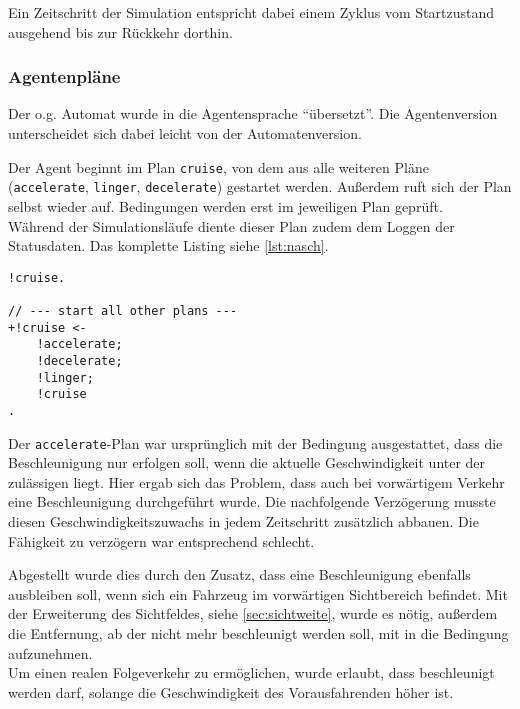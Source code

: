Ein Zeitschritt der Simulation entspricht dabei einem Zyklus vom Startzustand ausgehend bis zur Rückkehr dorthin.



\subsubsection{Agentenpläne}

Der o.g. Automat wurde in die Agentensprache \enquote{übersetzt}. 
Die Agentenversion unterscheidet sich dabei leicht von der Automatenversion. 

Der Agent beginnt im Plan \texttt{cruise}, von dem aus alle weiteren Pläne (\texttt{accelerate}, \texttt{linger}, \texttt{decelerate}) gestartet werden.
Außerdem ruft sich der Plan selbst wieder auf.
Bedingungen werden erst im jeweiligen Plan geprüft.
\\
Während der Simulationsläufe diente dieser Plan zudem dem Loggen der Statusdaten.
Das komplette Listing siehe \cref{lst:nasch}.

\begin{minipage}[hptb]{0.95\textwidth}
\begin{lstlisting}[style=asl, 
                   keywords={!cruise}, 
                   keywords={[2]}, 
                   keywords={[3]}, 
                   caption={Auszug aus Agentenscript: single lane-Version},
                   label={lst:nasch-auszug}]      
!cruise.

// --- start all other plans ---
+!cruise <-
    !accelerate;
    !decelerate;
    !linger;
    !cruise
.\end{lstlisting}
\end{minipage}

Der \texttt{accelerate}-Plan war ursprünglich mit der Bedingung ausgestattet, dass die Beschleunigung nur erfolgen soll, wenn die aktuelle Geschwindigkeit unter der zulässigen liegt.
Hier ergab sich das Problem, dass auch bei vorwärtigem Verkehr eine Beschleunigung durchgeführt wurde. Die nachfolgende Verzögerung musste diesen Geschwindigkeitszuwachs in jedem Zeitschritt zusätzlich abbauen.
Die Fähigkeit zu verzögern war entsprechend schlecht.

Abgestellt wurde dies durch den Zusatz, dass eine Beschleunigung ebenfalls ausbleiben soll, wenn sich ein Fahrzeug im vorwärtigen Sichtbereich befindet.
Mit der Erweiterung des Sichtfeldes, siehe \cref{sec:sichtweite}, wurde es nötig, außerdem die Entfernung, ab der nicht mehr beschleunigt werden soll, mit in die Bedingung aufzunehmen.
\\
Um einen realen Folgeverkehr zu ermöglichen, wurde erlaubt, dass beschleunigt werden darf, solange die Geschwindigkeit des Vorausfahrenden höher ist.


